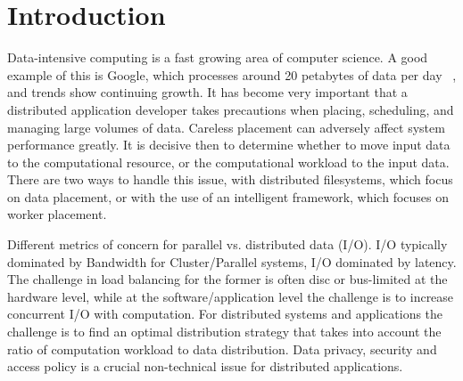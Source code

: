 \documentclass{rspublic}
\newcommand{\micnote}[1]{ {\textcolor{blue} { ***Michael: #1 }}}
\newcommand{\betynote}[1]{ {\textcolor{orange} { ***Bety: #1 }}}
\newcommand{\jhanote}[1]{} \newcommand{\micnote}[1]{}\newcommand{\betynote}[1]{} \newcommand{\fixme}[1]{}
\begin{document}
\section{Introduction} Data-intensive computing is a fast growing area
of computer science. A good example of this is Google, which processes
around 20 petabytes of data per day ~\citep{google}, and trends show
continuing growth. It has become very important that a distributed
application developer takes precautions when placing, scheduling, and
managing large volumes of data. Careless placement can adversely affect
system performance greatly. It is decisive then to determine whether to
move input data to the computational resource, or the computational
workload to the input data. There are two ways to handle this issue,
with distributed filesystems, which focus on data placement, or with the
use of an intelligent framework, which focuses on worker placement. 

\jhanote{refine} Different metrics of concern for parallel
vs. distributed data (I/O).  I/O typically dominated by Bandwidth for
Cluster/Parallel systems, I/O dominated by latency. The challenge in
load balancing for the former is often disc or bus-limited at the
hardware level, while at the software/application level the challenge
is to increase concurrent I/O with computation. For distributed
systems and applications the challenge is to find an optimal
distribution strategy that takes into account the ratio of
computation workload to data distribution.  Data privacy, security and
access policy is a crucial non-technical issue for distributed
applications.  
\end{document}
